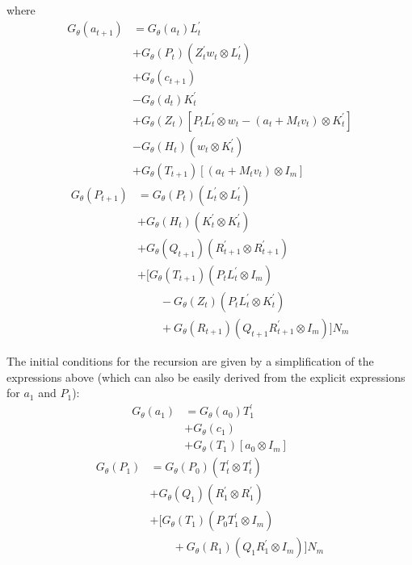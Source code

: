 \documentclass[12pt]{article}
\newcommand{\Gt}{G_\theta}
\begin{document}
where 
\begin{align*}
\Gt(a_{t+1}) &= \Gt(a_t)L_t^\prime \\ 	
 &+ \Gt(P_t) (Z_t^\prime w_t \otimes L_t^\prime) \\
 &+ \Gt(c_{t+1}) \\
 &- \Gt(d_t) K_t^\prime \\ 
 &+ \Gt(Z_t) [P_tL_t^\prime \otimes w_t - (a_t + M_t v_t) \otimes K_t^\prime] \\
 &- \Gt(H_t) (w_t \otimes K_t^\prime) \\ 
 &+ \Gt(T_{t+1})[(a_t + M_t v_t) \otimes I_m]
\end{align*}
\begin{align*}
\Gt(P_{t+1}) &= \Gt(P_t) (L_t^\prime \otimes L_t^\prime) \\
 &+ \Gt(H_t)(K_t^\prime \otimes K_t^\prime) \\
 &+ \Gt(Q_{t+1})(R_{t+1}^\prime \otimes R_{t+1}^\prime) \\
 &+ [\Gt(T_{t+1})(P_t L_t^\prime \otimes I_m) \\
 &\qquad - \Gt(Z_t)(P_t L_t^\prime \otimes K_t^\prime) \\
 &\qquad + \Gt(R_{t+1})(Q_{t+1}R_{t+1}^\prime \otimes I_m) ] N_m
\end{align*}


The initial conditions for the recursion are given by a simplification of the expressions above (which can also be easily derived from the explicit expressions for $a_1$ and $P_1$): 
\begin{align*}
\Gt(a_1) &= \Gt(a_0) T_1^\prime \\ 
 &+ \Gt(c_1)  \\
 &+ \Gt(T_1)[a_0 \otimes I_m]
\end{align*}
\begin{align*}
\Gt(P_1) &= \Gt(P_0) (T_t^\prime \otimes T_t^\prime) \\
 &+ \Gt(Q_1)(R_1^\prime \otimes R_1^\prime) \\
 &+ [\Gt(T_1)(P_0 T_1^\prime \otimes I_m) \\
 &\qquad + \Gt(R_1)(Q_1 R_1^\prime \otimes I_m) ] N_m
\end{align*}
\end{document}

